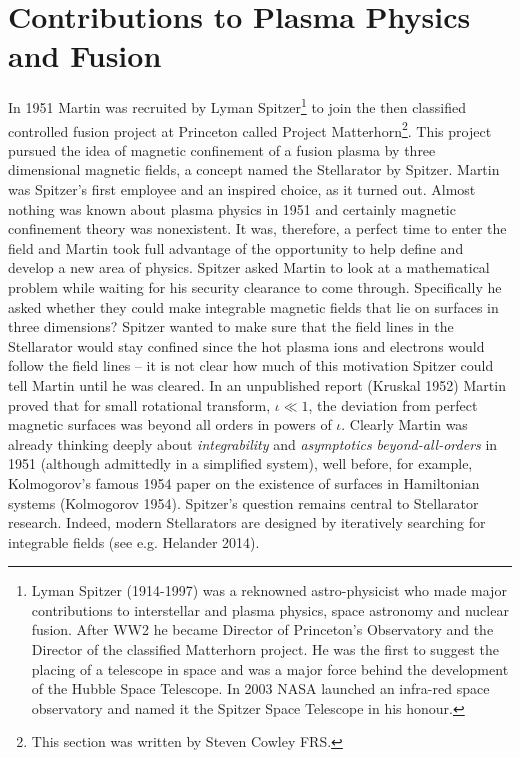 \documentclass[11pt]{article}
\begin{document}

\section{\large Contributions to Plasma Physics and Fusion}\label{sect:plasma}

In 1951 Martin was recruited by Lyman Spitzer\footnote{Lyman Spitzer (1914-1997) was a reknowned astro-physicist who made major contributions to interstellar and plasma physics, space astronomy and nuclear fusion.  After WW2 he became Director of Princeton's Observatory and the Director of the classified Matterhorn project. He was the first to suggest the placing of a telescope in space and was a major force behind the development of the Hubble Space Telescope. In 2003 NASA launched an infra-red space observatory and named it the Spitzer Space Telescope in his honour.} to join the then classified controlled fusion project at Princeton called Project Matterhorn\footnote{This section was written by Steven Cowley FRS.}. This project pursued the idea of magnetic confinement of a fusion plasma by three dimensional magnetic fields, a concept named the Stellarator by Spitzer.  Martin was Spitzer's first employee and an inspired choice, as it turned out.  Almost nothing was known about plasma physics in 1951 and certainly magnetic confinement theory was nonexistent.  It was, therefore, a perfect time to enter the field and Martin took full advantage of the opportunity to help define and develop a new area of physics.  Spitzer asked Martin to look at a mathematical problem while waiting for his security clearance to come through.   Specifically he asked whether they could make integrable magnetic fields that lie on surfaces in three dimensions?  Spitzer wanted to make sure that the field lines in the Stellarator would stay confined since the hot plasma ions and electrons would follow the field lines -- it is not clear how much of this motivation Spitzer could tell Martin until he was cleared.  In an unpublished report (Kruskal 1952) Martin proved that for small rotational transform, $\iota \ll 1$, the deviation from perfect magnetic surfaces was beyond all orders in powers of $\iota$.  Clearly Martin was already thinking deeply about \textit{integrability} and \textit{asymptotics beyond-all-orders} in 1951 (although admittedly in a simplified system), well before, for example, Kolmogorov's famous 1954 paper on the existence of surfaces in Hamiltonian systems (Kolmogorov 1954). Spitzer's question remains central to Stellarator research. Indeed, modern Stellarators are designed by iteratively searching for integrable fields (see e.g. Helander 2014).
\end{document}
